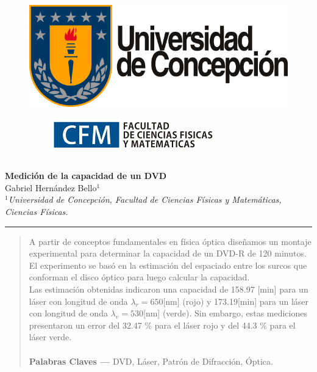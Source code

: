 \documentclass[10pt,a4paper]{article}
\author{Gabriel Hernandez Bello}
\begin{document}
	
	\begin{figure}[H]
		\raggedright
		\includegraphics[scale=0.2]{../Altura-Campanil/IMG/logo_udec.png} \hfill \includegraphics[scale=0.5]{../Altura-Campanil/IMG/cfm_logo.png}
	\end{figure}

	\vspace{6mm}
	\begin{center}
		{\Large \textbf{Medición de la capacidad de un DVD}}\\
		\vspace{2mm}
		{\large Gabriel Hernández Bello$^{1}$}\\
		\vspace{6.5mm}
		$^1$\textit{Universidad de Concepción, Facultad de Ciencias Físicas y Matemáticas, Ciencias Físicas. }\\
	\end{center}

	\begin{center}
		\textcolor{pinegreen}{\rule{150mm}{0.8mm}}
	\end{center}

	\begin{abstract}
	A partir de conceptos fundamentales en física óptica diseñamos un montaje experimental para determinar la capacidad de un DVD-R de 120 minutos. El experimento se basó en la estimación del espaciado entre los surcos que conforman el disco óptico para luego calcular la capacidad.\\
	Las estimación obtenidas indicaron una  capacidad de 158.97 [min] para un láser  con longitud de onda $\lambda_r = 650$[nm]  (rojo) y  173.19[min]  para un láser con longitud de onda $\lambda_v = 530$[nm] (verde). Sin embargo, estas mediciones presentaron un error del 32.47 $\%$ para el láser rojo y del 44.3 $\%$ para el láser verde.\\
	\\
		\textbf{Palabras Claves ---}  DVD, Láser, Patrón de Difracción, Óptica.
	\end{abstract}
	
\end{document}
